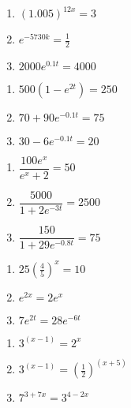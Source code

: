 \documentclass{ximera}
\begin{document}
\begin{multicols}{3}
\begin{enumerate}
\setcounter{enumi}{\value{HW}}

\item $(1.005)^{12x} = 3$
\item $e^{-5730k} = \frac{1}{2}$ 
\item $2000e^{0.1t} = 4000$  

\setcounter{HW}{\value{enumi}}
\end{enumerate}
\end{multicols}

\begin{multicols}{3}
\begin{enumerate}
\setcounter{enumi}{\value{HW}}


\item $500\left(1-e^{2t}\right) = 250$
\item $70 + 90e^{-0.1t} = 75$ 
\item $30-6e^{-0.1t}=20$ 


\setcounter{HW}{\value{enumi}}
\end{enumerate}
\end{multicols}

\begin{multicols}{3}
\begin{enumerate}
\setcounter{enumi}{\value{HW}}

\item $\dfrac{100e^{x}}{e^{x}+2}=50$ 
\item $\dfrac{5000}{1+2e^{-3t}}=2500$ 
\item $\dfrac{150}{1 + 29e^{-0.8t}} = 75$ 


\setcounter{HW}{\value{enumi}}
\end{enumerate}
\end{multicols}

\begin{multicols}{3}
\begin{enumerate}
\setcounter{enumi}{\value{HW}}

\item $25\left(\frac{4}{5}\right)^{x} = 10$  

\item $e^{2x} = 2e^{x}$ 
\item  $7e^{2t} = 28e^{-6t}$ 

\setcounter{HW}{\value{enumi}}
\end{enumerate}
\end{multicols}

\begin{multicols}{3}
\begin{enumerate}
\setcounter{enumi}{\value{HW}}

\item $3^{(x - 1)} = 2^{x}$ 
\item $3^{(x - 1)} = \left(\frac{1}{2}\right)^{(x + 5)}$ 
\item  $7^{3+7x} = 3^{4-2x}$  

\setcounter{HW}{\value{enumi}}
\end{enumerate}
\end{multicols}
\end{document}
